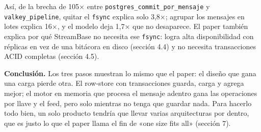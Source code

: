 \documentclass[10pt,letterpaper]{article}
\begin{document}
Así, de la brecha de 105× entre \texttt{postgres\_commit\_por\_mensaje} y \texttt{valkey\_pipeline},
quitar el \texttt{fsync} explica solo 3,8×; agrupar los mensajes en lotes explica 16×, y el modelo deja
1,7× que no desaparece. El paper también explica por qué StreamBase no necesita ese \texttt{fsync}: logra
alta disponibilidad con réplicas en vez de una bitácora en disco (sección 4.4) y no necesita
transacciones ACID completas (sección 4.5).

\textbf{Conclusión.} Los tres pasos muestran lo mismo que el paper: el diseño que gana una carga pierde
otra. El row-store con transacciones guarda, carga y agrega mejor; el motor en memoria que procesa el
mensaje adentro gana las operaciones por llave y el feed, pero solo mientras no tenga que guardar nada.
Para hacerlo todo bien, un solo producto tendría que llevar varias arquitecturas por dentro, que es justo
lo que el paper llama el fin de «one size fits all» (sección 7).
\end{document}
